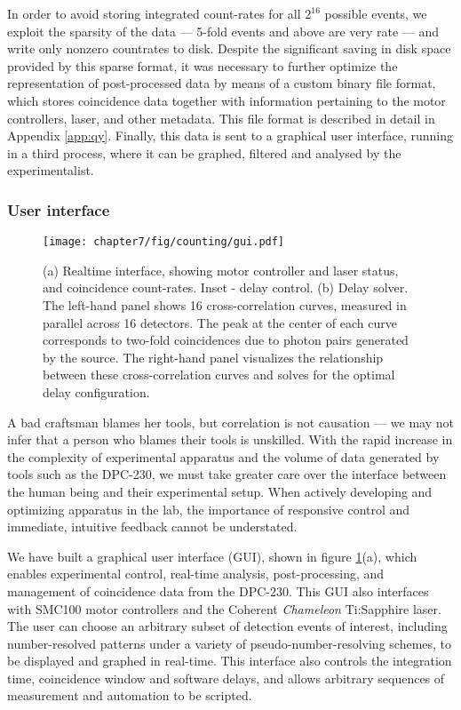 In order to avoid storing integrated count-rates for all $2^{16}$ possible events, we exploit the sparsity of the data --- 5-fold events and above are very rate --- and write only nonzero countrates to disk.  Despite the significant saving in disk space provided by this sparse format, it was necessary to further optimize the representation of post-processed data by means of a custom binary file format, which stores coincidence data together with information pertaining to the motor controllers, laser, and other metadata. This file format is described in detail in Appendix \ref{app:qy}.
Finally, this data is sent to a graphical user interface, running in a third process, where it can be graphed, filtered and analysed by the experimentalist.

\subsubsection{User interface}
\begin{figure}[t!]
\centering
\texttt{[image: chapter7/fig/counting/gui.pdf]}
\caption[Coincidence counting GUI]{
(a) Realtime interface, showing motor controller and laser status, and coincidence count-rates. Inset - delay control. (b) Delay solver. The left-hand panel shows 16 cross-correlation curves, measured in parallel across 16 detectors. The peak at the center of each curve corresponds to two-fold coincidences due to photon pairs generated by the source. The right-hand panel visualizes the relationship between these cross-correlation curves and solves for the optimal delay configuration.
}
\label{fig:counting-gui}
\end{figure}

A bad craftsman blames her tools, but correlation is not causation --- we may not infer that a person who blames their tools is unskilled. With the rapid increase in the complexity of experimental apparatus and the volume of data generated by tools such as the DPC-230, we must take greater care over the interface between the human being and their experimental setup. When actively developing and optimizing apparatus in the lab, the importance of responsive control and immediate, intuitive feedback cannot be understated.

We have built a graphical user interface (GUI), shown in figure \ref{fig:counting-gui}(a), which enables experimental control, real-time analysis, post-processing, and management of coincidence data from the DPC-230.  This GUI also interfaces with SMC100 motor controllers and the Coherent \emph{Chameleon} Ti:Sapphire laser. The user can choose an arbitrary subset of detection events of interest, including number-resolved patterns under a variety of pseudo-number-resolving schemes, to be displayed and graphed in real-time. This interface also controls the integration time, coincidence window and software delays, and allows arbitrary sequences of measurement and automation to be scripted.

